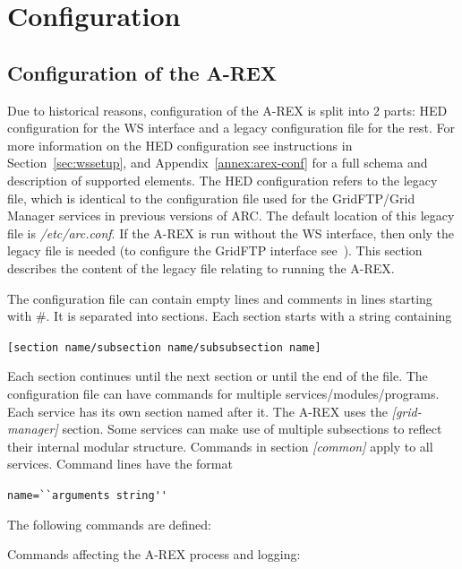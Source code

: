 \documentclass{article}                            %
\begin{document}
\section{Configuration}

\subsection{Configuration of the A-REX\label{SubSection:ConfigFile}}

Due to historical reasons, configuration of the A-REX is split into 2
parts: HED configuration for the WS interface and a legacy
configuration file for the rest. For more information on the HED
configuration see instructions in Section~\ref{sec:wssetup}, and
Appendix~\ref{annex:arex-conf} for a full schema and description of
supported elements. The HED configuration refers to the legacy file,
which is identical to the configuration file used for the GridFTP/Grid
Manager services in previous versions of ARC. The default location of
this legacy file is \textit{/etc/arc.conf}. If the A-REX is run
without the WS interface, then only the legacy file is needed (to
configure the GridFTP interface see~\cite{gm}). This section describes
the content of the legacy file relating to running the A-REX.

The configuration file can contain empty lines and comments in lines
starting with \#. It is separated into sections. Each section starts
with a string containing

\begin{shaded}
\verb|[section name/subsection name/subsubsection name]|
\end{shaded}

Each section continues until the next section or until the end of the
file. The configuration file can have commands for multiple
services/modules/programs. Each service has its own section named
after it. The A-REX uses the \emph{{[}grid-manager]} section. Some
services can make use of multiple subsections to reflect their
internal modular structure. Commands in section \emph{{[}common]}
apply to all services. Command lines have the format

\begin{shaded}
\verb|name=``arguments string''|
\end{shaded}
The following commands are defined:

Commands affecting the A-REX process and logging:
\end{document}
